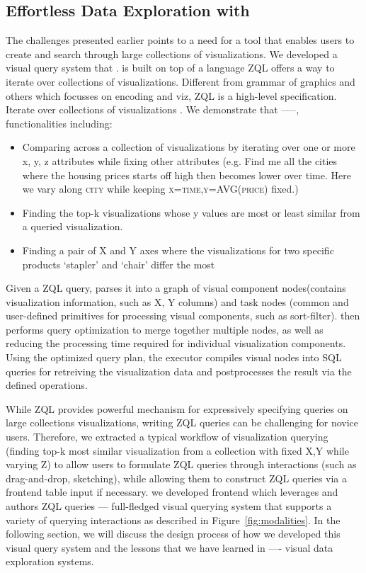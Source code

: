 \subsection{Effortless Data Exploration with \zv}
\par The challenges presented earlier points to a need for a tool that enables users to create and search through large collections of visualizations. We developed \zv a visual query system that . \zv is built on top of a language ZQL offers a way to iterate over collections of visualizations. Different from grammar of graphics and others which focusses on encoding and viz\cite{Wongsuphasawat2016}, ZQL is a high-level specification. Iterate over collections of visualizations \cite{Siddiqui}. We demonstrate that -----, functionalities including: 
\begin{itemize}
	\item Comparing across a collection of visualizations by iterating over one or more x, y, z attributes while fixing other attributes (e.g. Find me all the cities where the housing prices starts off high then becomes lower over time. Here we vary along \textsc{city} while keeping \textsc{x=time,y=AVG(price)} fixed.)
	\item Finding the top-k visualizations whose y values are most or least similar from a queried visualization. 
	\item Finding a pair of X and Y axes where the visualizations for two specific products ‘stapler’ and ‘chair’ differ the most
\end{itemize}
\par Given a ZQL query, \zv parses it into a graph of visual component nodes(contains visualization information, such as X, Y columns) and task nodes (common and user-defined primitives for processing visual components, such as sort-filter). \zv then performs query optimization to merge together multiple nodes, as well as reducing the processing time required for individual visualization components. Using the optimized query plan, the executor compiles visual nodes into SQL queries for retreiving the visualization data and postprocesses the result via the defined operations. 
\par While ZQL provides powerful mechanism for expressively specifying queries on large collections visualizations, writing ZQL queries can be challenging for novice users. Therefore, we extracted a typical workflow of visualization querying (finding top-k most similar visualization from a collection with fixed X,Y while varying Z) to allow users to formulate ZQL queries through interactions (such as drag-and-drop, sketching), while allowing them to construct ZQL queries via a frontend table input if necessary.  we developed \zv frontend which leverages and authors ZQL queries --- full-fledged visual querying system that supports a variety of querying interactions as described in Figure~\ref{fig:modalities}. In the following section, we will discuss the design process of how we developed this visual query system and the lessons that we have learned in ---- visual data exploration systems.

